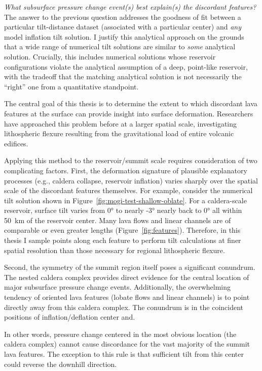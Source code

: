 \emph{What subsurface pressure change event(s) best explain(s) the discordant features?} The answer to the previous question addresses the goodness of fit between a particular tilt-distance dataset (associated with a particular center) and \emph{any} model inflation tilt solution. I justify this analytical approach on the grounds that a wide range of numerical tilt solutions are similar to \emph{some} analytical solution. Crucially, this includes numerical solutions whose reservoir configurations violate the analytical assumption of a deep, point-like reservoir, with the tradeoff that the matching analytical solution is not necessarily the ``right'' one from a quantitative standpoint.

The central goal of this thesis is to determine the extent to which discordant lava features at the surface can provide insight into surface deformation. Researchers have approached this problem before \parencite{mouginis-mark_ancient_1982,isherwood_volcanic_2013,chadwick_late_2015} at a larger spatial scale, investigating lithospheric flexure resulting from the gravitational load of entire volcanic edifices.

Applying this method to the reservoir/summit scale requires consideration of two complicating factors. First, the deformation signature of plausible explanatory processes (e.g., caldera collapse, reservoir inflation) varies sharply over the spatial scale of the discordant features themselves. For example, consider the numerical tilt solution shown in Figure~\ref{fig:mogi-test-shallow-oblate}. For a caldera-scale reservoir, surface tilt varies from \ang{0} to nearly \ang{-3} nearly back to \ang{0} all within \qty{50}{\km} of the reservoir center. Many lava flows and linear channels are of comparable or even greater lengths (Figure~\ref{fig:features}). Therefore, in this thesis I sample points along each feature to perform tilt calculations at finer spatial resolution than those necessary for regional lithospheric flexure.

Second, the symmetry of the summit region itself poses a significant conundrum. The nested caldera complex provides direct evidence for the central location of major subsurface pressure change events. Additionally, the overwhelming tendency of oriented lava features (lobate flows and linear channels) is to point directly away from this caldera complex. The conundrum is in the coincident positions of inflation/deflation center and.

In other words, pressure change centered in the most obvious location (the caldera complex) cannot cause discordance for the vast majority of the summit lava features. The exception to this rule is that sufficient tilt from this center could reverse the downhill direction.

